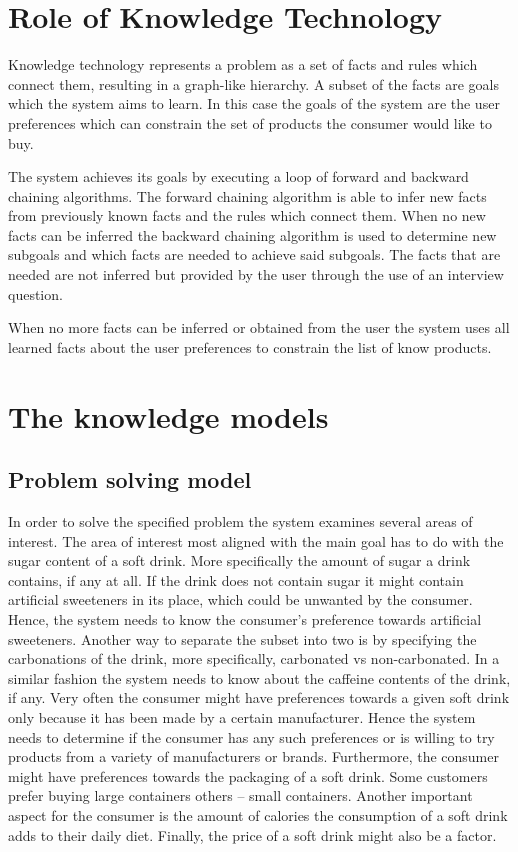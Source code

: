 \documentclass[11pt,a4paper]{article}
\begin{document}
\section{Role of Knowledge Technology}

Knowledge technology represents a problem as a set of facts and rules which connect them, resulting in a graph-like hierarchy. A subset of the facts are goals which the system aims to learn. In this case the goals of the system are the user preferences which can constrain the set of products the consumer would like to buy.

The system achieves its goals by executing a loop of forward and backward chaining algorithms. The forward chaining algorithm is able to infer new facts from previously known facts and the rules which connect them. When no new facts can be inferred the backward chaining algorithm is used to determine new subgoals and which facts are needed to achieve said subgoals. The facts that are needed are not inferred but provided by the user through the use of an interview question.

When no more facts can be inferred or obtained from the user the system uses all learned facts about the user preferences to constrain the list of know products.

\section{The knowledge models}

\subsection{Problem solving model}

In order to solve the specified problem the system examines several areas of interest. The area of interest most aligned with the main goal has to do with the sugar content of a soft drink. More specifically the amount of sugar a drink contains, if any at all. If the drink does not contain sugar it might contain artificial sweeteners in its place, which could be unwanted by the consumer. Hence, the system needs to know the consumer's preference towards artificial sweeteners. Another way to separate the subset into two is by specifying the carbonations of the drink, more specifically, carbonated vs non-carbonated. In a similar fashion the system needs to know about the caffeine contents of the drink, if any. Very often the consumer might have preferences towards a given soft drink only because it has been made by a certain manufacturer. Hence the system needs to determine if the consumer has any such preferences or is willing to try products from a variety of manufacturers or brands. Furthermore, the consumer might have preferences towards the packaging of a soft drink. Some customers prefer buying large containers others -- small containers. Another important aspect for the consumer is the amount of calories the consumption of a soft drink adds to their daily diet. Finally, the price of a soft drink might also be a factor.  
\end{document}

